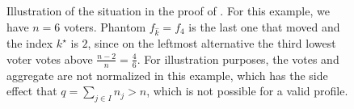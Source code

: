 \documentclass[11pt]{article}
\begin{document}
\begin{figure}
    \caption{Illustration of the situation in the proof of . For this example, we have $n = 6$ voters. Phantom $f_{\hat{k}} = f_4$ is the last one that moved and the index $k^\star$ is $2$, since on the leftmost alternative the third lowest voter votes above $\frac{n-2}{n} = \frac{4}{6}$. For illustration purposes, the votes and aggregate are not normalized in this example, which has the side effect that $q = \sum_{j \in I} n_j > n$, which is not possible for a valid profile.}
    \label{fig:utilPropMbound}
\end{figure}


\thmmbound*
\end{document}
